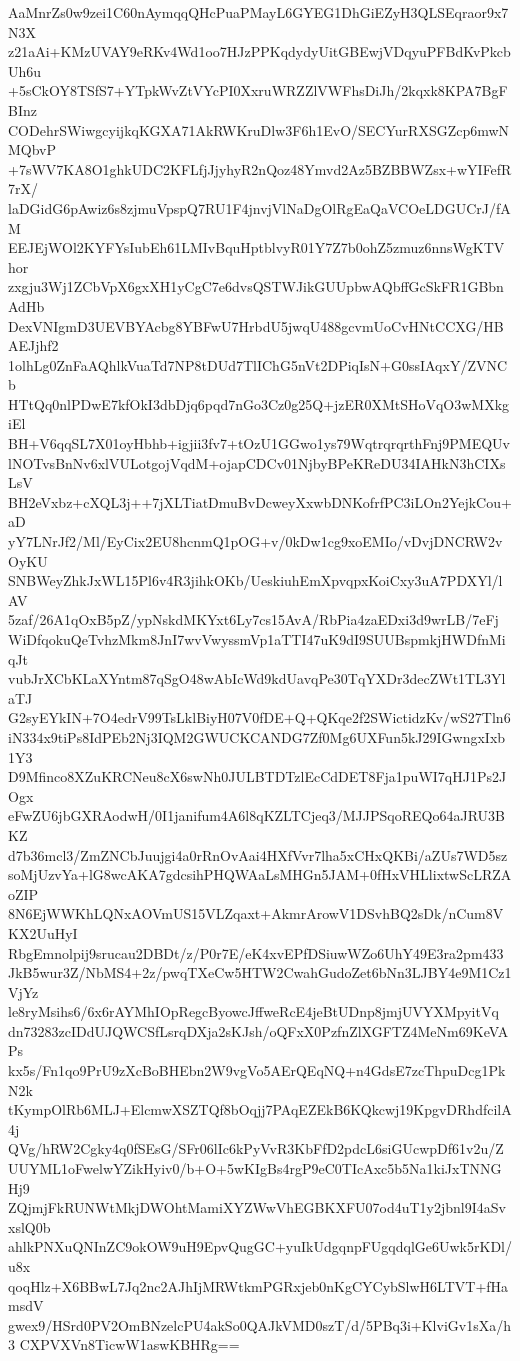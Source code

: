 AaMnrZs0w9zei1C60nAymqqQHcPuaPMayL6GYEG1DhGiEZyH3QLSEqraor9x7N3X
z21aAi+KMzUVAY9eRKv4Wd1oo7HJzPPKqdydyUitGBEwjVDqyuPFBdKvPkcbUh6u
+5sCkOY8TSfS7+YTpkWvZtVYcPI0XxruWRZZlVWFhsDiJh/2kqxk8KPA7BgFBInz
CODehrSWiwgcyijkqKGXA71AkRWKruDlw3F6h1EvO/SECYurRXSGZcp6mwNMQbvP
+7sWV7KA8O1ghkUDC2KFLfjJjyhyR2nQoz48Ymvd2Az5BZBBWZsx+wYIFefR7rX/
laDGidG6pAwiz6s8zjmuVpspQ7RU1F4jnvjVlNaDgOlRgEaQaVCOeLDGUCrJ/fAM
EEJEjWOl2KYFYsIubEh61LMIvBquHptblvyR01Y7Z7b0ohZ5zmuz6nnsWgKTVhor
zxgju3Wj1ZCbVpX6gxXH1yCgC7e6dvsQSTWJikGUUpbwAQbffGcSkFR1GBbnAdHb
DexVNIgmD3UEVBYAcbg8YBFwU7HrbdU5jwqU488gcvmUoCvHNtCCXG/HBAEJjhf2
1olhLg0ZnFaAQhlkVuaTd7NP8tDUd7TlIChG5nVt2DPiqIsN+G0ssIAqxY/ZVNCb
HTtQq0nlPDwE7kfOkI3dbDjq6pqd7nGo3Cz0g25Q+jzER0XMtSHoVqO3wMXkgiEl
BH+V6qqSL7X01oyHbhb+igjii3fv7+tOzU1GGwo1ys79WqtrqrqrthFnj9PMEQUv
lNOTvsBnNv6xlVULotgojVqdM+ojapCDCv01NjbyBPeKReDU34IAHkN3hCIXsLsV
BH2eVxbz+cXQL3j++7jXLTiatDmuBvDcweyXxwbDNKofrfPC3iLOn2YejkCou+aD
yY7LNrJf2/Ml/EyCix2EU8hcnmQ1pOG+v/0kDw1cg9xoEMIo/vDvjDNCRW2vOyKU
SNBWeyZhkJxWL15Pl6v4R3jihkOKb/UeskiuhEmXpvqpxKoiCxy3uA7PDXYl/lAV
5zaf/26A1qOxB5pZ/ypNskdMKYxt6Ly7cs15AvA/RbPia4zaEDxi3d9wrLB/7eFj
WiDfqokuQeTvhzMkm8JnI7wvVwyssmVp1aTTI47uK9dI9SUUBspmkjHWDfnMiqJt
vubJrXCbKLaXYntm87qSgO48wAbIcWd9kdUavqPe30TqYXDr3decZWt1TL3YlaTJ
G2syEYkIN+7O4edrV99TsLklBiyH07V0fDE+Q+QKqe2f2SWictidzKv/wS27Tln6
iN334x9tiPs8IdPEb2Nj3IQM2GWUCKCANDG7Zf0Mg6UXFun5kJ29IGwngxIxb1Y3
D9Mfinco8XZuKRCNeu8cX6swNh0JULBTDTzlEcCdDET8Fja1puWI7qHJ1Ps2JOgx
eFwZU6jbGXRAodwH/0I1janifum4A6l8qKZLTCjeq3/MJJPSqoREQo64aJRU3BKZ
d7b36mcl3/ZmZNCbJuujgi4a0rRnOvAai4HXfVvr7lha5xCHxQKBi/aZUs7WD5sz
soMjUzvYa+lG8wcAKA7gdcsihPHQWAaLsMHGn5JAM+0fHxVHLlixtwScLRZAoZIP
8N6EjWWKhLQNxAOVmUS15VLZqaxt+AkmrArowV1DSvhBQ2sDk/nCum8VKX2UuHyI
RbgEmnolpij9srucau2DBDt/z/P0r7E/eK4xvEPfDSiuwWZo6UhY49E3ra2pm433
JkB5wur3Z/NbMS4+2z/pwqTXeCw5HTW2CwahGudoZet6bNn3LJBY4e9M1Cz1VjYz
le8ryMsihs6/6x6rAYMhIOpRegcByowcJffweRcE4jeBtUDnp8jmjUVYXMpyitVq
dn73283zcIDdUJQWCSfLsrqDXja2sKJsh/oQFxX0PzfnZlXGFTZ4MeNm69KeVAPs
kx5s/Fn1qo9PrU9zXcBoBHEbn2W9vgVo5AErQEqNQ+n4GdsE7zcThpuDcg1PkN2k
tKympOlRb6MLJ+ElcmwXSZTQf8bOqjj7PAqEZEkB6KQkcwj19KpgvDRhdfcilA4j
QVg/hRW2Cgky4q0fSEsG/SFr06lIc6kPyVvR3KbFfD2pdcL6siGUcwpDf61v2u/Z
UUYML1oFwelwYZikHyiv0/b+O+5wKIgBs4rgP9eC0TIcAxc5b5Na1kiJxTNNGHj9
ZQjmjFkRUNWtMkjDWOhtMamiXYZWwVhEGBKXFU07od4uT1y2jbnl9I4aSvxslQ0b
ahlkPNXuQNInZC9okOW9uH9EpvQugGC+yuIkUdgqnpFUgqdqlGe6Uwk5rKDl/u8x
qoqHlz+X6BBwL7Jq2nc2AJhIjMRWtkmPGRxjeb0nKgCYCybSlwH6LTVT+fHamsdV
gwex9/HSrd0PV2OmBNzelcPU4akSo0QAJkVMD0szT/d/5PBq3i+KlviGv1sXa/h3
CXPVXVn8TicwW1aswKBHRg==

